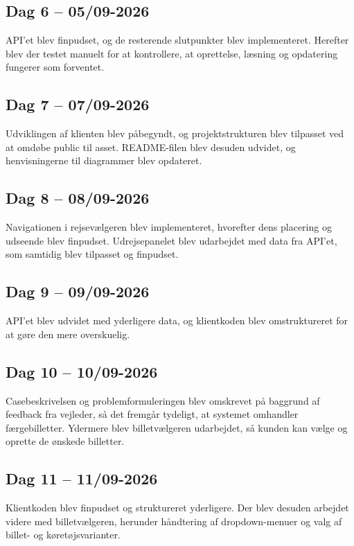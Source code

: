 \documentclass[a4paper, 11pt]{article}
\begin{document}
\subsection{Dag 6 -- 05/09-2026}

API'et blev finpudset, og de resterende slutpunkter blev implementeret. Herefter blev der testet
manuelt for at kontrollere, at oprettelse, læsning og opdatering fungerer som forventet.

\subsection{Dag 7 -- 07/09-2026}

Udviklingen af klienten blev påbegyndt, og projektstrukturen blev tilpasset ved at omdøbe public
til asset. README-filen blev desuden udvidet, og henvisningerne til diagrammer blev opdateret.

\subsection{Dag 8 -- 08/09-2026}

Navigationen i rejsevælgeren blev implementeret, hvorefter dens placering og udseende blev
finpudset. Udrejsepanelet blev udarbejdet med data fra API'et, som samtidig blev tilpasset og
finpudset.

\subsection{Dag 9 -- 09/09-2026}

API'et blev udvidet med yderligere data, og klientkoden blev omstruktureret for at gøre den mere
overskuelig.

\subsection{Dag 10 -- 10/09-2026}

Casebeskrivelsen og problemformuleringen blev omskrevet på baggrund af feedback fra vejleder, så
det fremgår tydeligt, at systemet omhandler færgebilletter. Ydermere blev billetvælgeren
udarbejdet, så kunden kan vælge og oprette de ønskede billetter.

\subsection{Dag 11 -- 11/09-2026}

Klientkoden blev finpudset og struktureret yderligere. Der blev desuden arbejdet videre med
billetvælgeren, herunder håndtering af dropdown-menuer og valg af billet- og køretøjsvarianter.
\end{document}
